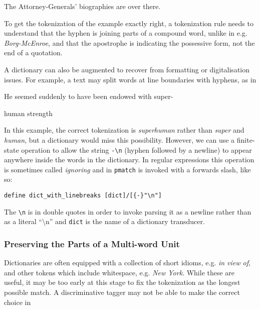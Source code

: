 \documentclass{llncs}
\begin{document}
\begin{exe}
  \item The Attorney-Generals' biographies are over there.
\end{exe}

\noindent To get the tokenization of the example exactly right, a tokenization rule 
needs to understand that the hyphen is joining parts of a compound word, unlike in e.g.
\emph{Borg-McEnroe}, and that the apostrophe is indicating the possessive form,
not the end of a quotation.

A dictionary can also be augmented to recover from
formatting or digitalisation issues. For example, a text may split words
at line boundaries with hyphens, as in

\begin{exe}
\item He seemed suddenly to have been endowed with super-

  human strength
\end{exe}

\noindent In this example,  the correct tokenization is \mbox{\emph{superhuman}} rather than
\mbox{\emph{super}} and \mbox{\emph{human}}, but a dictionary would miss this possibility. However,
we can use a finite-state operation to allow the string \verb+-\n+ (hyphen
followed by a newline) to appear anywhere inside the words in the dictionary.
In regular expressions this operation is sometimes called \emph{ignoring} and in
\verb+pmatch+ is invoked with a forwards slash, like so:

\begin{center}
  \begin{framed}
\begin{verbatim}
define dict_with_linebreaks [dict]/[{-}"\n"]
\end{verbatim}
  \end{framed}
\end{center}

\noindent The \verb+\n+ is in double quotes in order to invoke parsing it as a newline
rather than as a literal ``\textbackslash n'' and \verb+dict+ is the name of a dictionary transducer. 

\subsubsection{Preserving the Parts of a Multi-word Unit}

Dictionaries are often equipped with a collection of short idioms, e.g.\@
\emph{in view of}, and other tokens which include whitespace, e.g.\@
\emph{New York}. While these are useful, it may be too early at this stage
to fix the tokenization as the longest possible match. A discriminative
tagger may not be able to make the correct choice in
\end{document}
